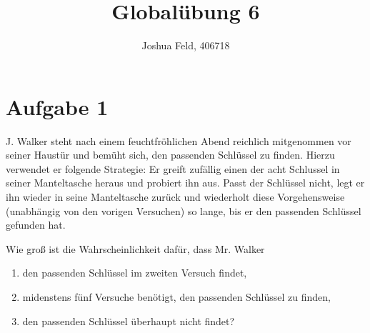 \documentclass{exercise}
\institute{Institut für Statistik und Wirtschaftsmathematik}
\title{Globalübung 6}
\author{Joshua Feld, 406718}
\begin{document}
    \maketitle


    \section*{Aufgabe 1}

    \begin{problem}
        J. Walker steht nach einem feuchtfröhlichen Abend reichlich mitgenommen vor seiner Haustür und bemüht sich, den passenden Schlüssel zu finden.
        Hierzu verwendet er folgende Strategie: Er greift zufällig einen der acht Schlussel in seiner Manteltasche heraus und probiert ihn aus.
        Passt der Schlüssel nicht, legt er ihn wieder in seine Manteltasche zurück und wiederholt diese Vorgehensweise (unabhängig von den vorigen Versuchen) so lange, bis er den passenden Schlüssel gefunden hat.
        
        Wie groß ist die Wahrscheinlichkeit dafür, dass Mr. Walker
        \begin{enumerate}
            \item den passenden Schlüssel im zweiten Versuch findet,
            \item midenstens fünf Versuche benötigt, den passenden Schlüssel zu finden,
            \item den passenden Schlüssel überhaupt nicht findet?
        \end{enumerate}
    \end{problem}
\end{document}
